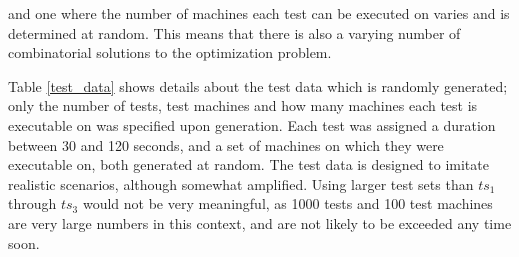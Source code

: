 \noindent and one where the number of machines each test can be executed on varies and is determined at random. This means that there is also a varying number of combinatorial solutions to the optimization problem.

Table \ref{test_data} shows details about the test data which is randomly generated; only the number of tests, test machines and how many machines each test is executable on was specified upon generation. Each test was assigned a duration between 30 and 120 seconds, and a set of machines on which they were executable on, both generated at random. The test data is designed to imitate realistic scenarios, although somewhat amplified. Using larger test sets than $ts_1$ through $ts_3$ would not be very meaningful, as 1000 tests and 100 test machines are very large numbers in this context, and are not likely to be exceeded any time soon.

